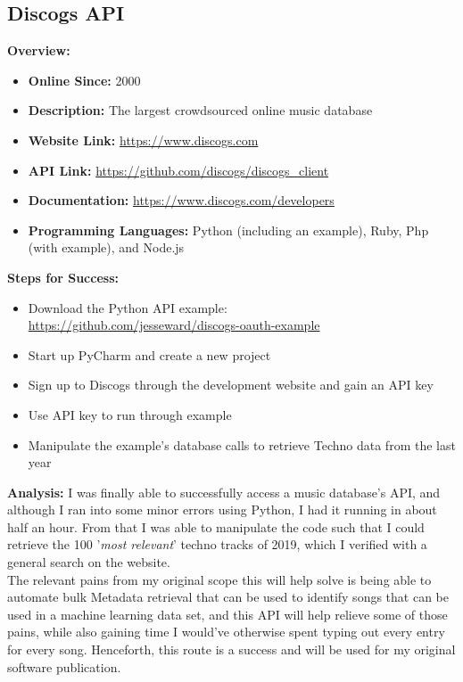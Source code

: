 \documentclass{article}
\begin{document}
\subsection{Discogs API}
\textbf{Overview:}
\begin{itemize}
    \item \textbf{Online Since:} 2000
    \item \textbf{Description:} The largest crowdsourced online music database
    \item \textbf{Website Link:} \url{https://www.discogs.com}
    \item \textbf{API Link:} \url{https://github.com/discogs/discogs_client}
    \item \textbf{Documentation:} \url{https://www.discogs.com/developers}
    \item \textbf{Programming Languages:} Python (including an example), Ruby, Php (with example), and Node.js
\end{itemize}
\textbf{Steps for Success:}
\begin{itemize}
    \item Download the Python API example:\\
    \url{https://github.com/jesseward/discogs-oauth-example}
    \item Start up PyCharm and create a new project
    \item Sign up to Discogs through the development website and gain an API key
    \item Use API key to run through example
    \item Manipulate the example's database calls to retrieve Techno data from the last year
\end{itemize}
\textbf{Analysis:} I was finally able to successfully access a music database's API, and although I ran into some minor errors using Python, I had it running in about half an hour. From that I was able to manipulate the code such that I could retrieve the 100 '\textit{most relevant}' techno tracks of 2019, which I verified with a general search on the website.\\
The relevant pains from my original scope this will help solve is being able to automate bulk Metadata retrieval that can be used to identify songs that can be used in a machine learning data set, and this API will help relieve some of those pains, while also gaining time I would've otherwise spent typing out every entry for every song.
Henceforth, this route is a success and will be used for my original software publication.\\
\end{document}
